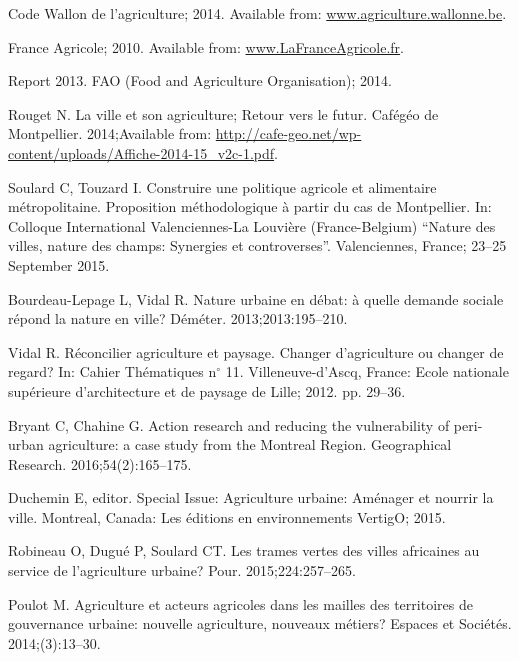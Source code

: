 \documentclass[10pt,a4paper]{article}
\begin{document}
\begin{multicols}{2}
\begin{thebibliography}{10}
Code Wallon de l’agriculture; 2014.
\newblock Available from: \url{www.agriculture.wallonne.be}.

France Agricole; 2010.
\newblock Available from: \url{www.LaFranceAgricole.fr}.

Report 2013.
\newblock FAO (Food and Agriculture Organisation); 2014.

Rouget N.
\newblock La ville et son agriculture; Retour vers le futur.
\newblock Cafégéo de Montpellier. 2014;Available from:
  \url{http://cafe-geo.net/wp-content/uploads/Affiche-2014-15_v2c-1.pdf}.

Soulard C, Touzard I.
\newblock Construire une politique agricole et alimentaire métropolitaine.
  Proposition méthodologique à partir du cas de Montpellier.
\newblock In: Colloque International Valenciennes-La Louvière (France-Belgium)
  ``Nature des villes, nature des champs: Synergies et controverses''.
  Valenciennes, France; 23--25 September 2015.

Bourdeau-Lepage L, Vidal R.
\newblock Nature urbaine en d{\'e}bat: {\`a} quelle demande sociale r{\'e}pond
  la nature en ville?
\newblock D{\'e}m{\'e}ter. 2013;2013:195--210.

Vidal R.
\newblock Réconcilier agriculture et paysage. Changer d'agriculture ou changer
  de regard?
\newblock In: Cahier Thématiques n$^{\circ}$ 11. Villeneuve-d'Ascq, France:
  Ecole nationale supérieure d’architecture et de paysage de Lille; 2012. pp.
  29--36.

Bryant C, Chahine G.
\newblock Action research and reducing the vulnerability of peri-urban
  agriculture: a case study from the Montreal Region.
\newblock Geographical Research. 2016;54(2):165--175.


Duchemin E, editor.
\newblock Special Issue: Agriculture urbaine: Am{\'e}nager et nourrir la ville.
\newblock Montreal, Canada: Les {\'e}ditions en environnements VertigO; 2015.

Robineau O, Dugu{\'e} P, Soulard CT.
\newblock Les trames vertes des villes africaines au service de l’agriculture
  urbaine?
\newblock Pour. 2015;224:257--265.

Poulot M.
\newblock Agriculture et acteurs agricoles dans les mailles des territoires de
  gouvernance urbaine: nouvelle agriculture, nouveaux m{\'e}tiers?
\newblock Espaces et Soci{\'e}t{\'e}s. 2014;(3):13--30.


\end{thebibliography}
\end{multicols}
\end{document}
